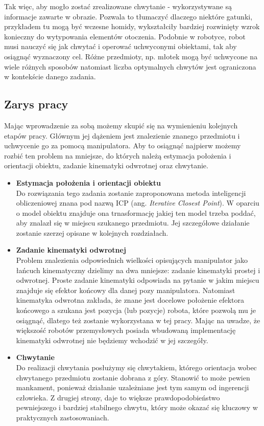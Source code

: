 \documentclass{article}
\begin{document}
Tak więc, aby mogło zostać zrealizowane chwytanie -  wykorzystywane są informacje zawarte w obrazie. Pozwala to tłumaczyć dlaczego niektóre gatunki, przykładem tu mogą być wczesne homidy, wykształciły bardziej rozwinięty wzrok konieczny do wytypowania elementów otoczenia. Podobnie w robotyce, robot musi nauczyć się jak chwytać i operować uchwyconymi obiektami, tak aby osiągnąć wyznaczony cel. Różne przedmioty, np. młotek mogą być uchwycone na wiele różnych sposobów natomiast liczba optymalnych chwytów jest ograniczona w kontekście danego zadania. 

\subsection{\LARGE{Zarys pracy}}
Mając wprowadzenie za sobą możemy skupić się na wymienieniu kolejnych etapów pracy. Głównym jej dążeniem jest znalezienie znanego przedmiotu i uchwycenie go za pomocą manipulatora. Aby to osiągnąć najpierw możemy rozbić ten problem na mniejsze, do których należą estymacja położenia i orientacji obiektu, zadanie kinematyki odwrotnej oraz chwytanie.

\begin{itemize}
\item \textbf{Estymacja położenia i orientacji obiektu} \\
Do rozwiązania tego zadania zostanie zaproponowana metoda inteligencji obliczeniowej znana pod nazwą ICP (ang. \emph{Iterative Closest Point}). W oparciu o model obiektu znajduje ona trnasformację jakiej ten model trzeba poddać, aby znalazł się w miejscu szukanego przedmiotu. Jej szczegółowe działanie zostanie szerzej opisane w kolejnych rozdziałach.

\item \textbf{Zadanie kinematyki odwrotnej} \\
Problem znalezienia odpowiednich wielkości opisujących manipulator jako łańcuch kinematyczny dzielimy na dwa mniejsze: zadanie kinematyki prostej i odwrotnej. Proste zadanie kinematyki odpowiada na pytanie w jakim miejscu znajduje się efektor końcowy dla danej pozy manipulatora. Natomiast kinematyka odwrotna zakłada, że znane jest docelowe położenie efektora końcowego a szukana jest pozycja (lub pozycje) robota, które pozwolą mu je osiągnąć, dlatego też zostanie wykorzystana w tej pracy. Mając na uwadze, że większość robotów przemysłowych posiada wbudowaną implementację kinematyki odwrotnej nie będziemy wchodzić w jej szczegóły.

\item \textbf{Chwytanie} \\
Do realizacji chwytania posłużymy się chwytakiem, którego orientacja wobec chwytanego przedmiotu zostanie dobrana z góry. Stanowić to może pewien mankament, ponieważ działanie uzależniane jest tym samym od ingerencji człowieka. Z drugiej strony, daje to większe prawdopodobieństwo pewniejszego i bardziej stabilnego chwytu, który może okazać się kluczowy w praktycznych zastosowaniach.
\end{itemize}
\end{document}
